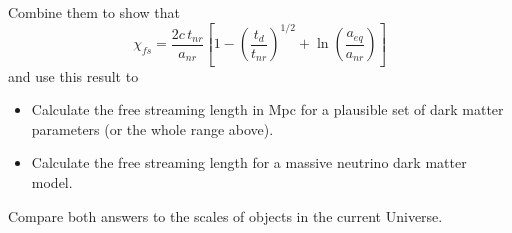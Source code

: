 \documentclass[12pt]{article}
\begin{document}
Combine them to show that
\begin{equation}
    \chi_{fs} = \frac{2 c \, t_{nr}}{a_{nr}} \left[1 - \left(\frac{t_d}{t_{nr}}\right)^{1/2} + \ln{\left(\frac{a_{eq}}{a_{nr}}\right)}\right]
\end{equation}
and use this result to
\begin{itemize}
    \item Calculate the free streaming length in Mpc for a plausible set of dark matter parameters (or the whole range above).
    \item Calculate the free streaming length for a massive neutrino dark matter model.
\end{itemize}
Compare both answers to the scales of objects in the current Universe.
\end{document}
